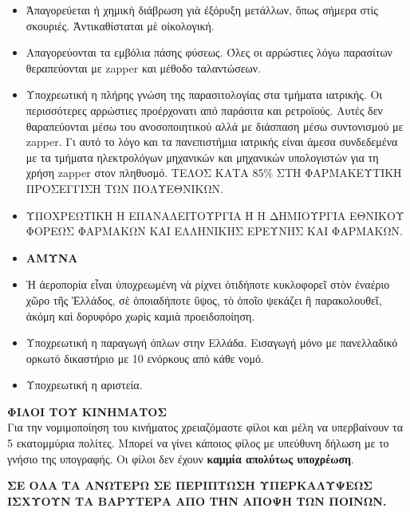\documentclass[a4paper]{article}
\begin{document}
\begin{itemize}
\item Ἀπαγορεύεται ἡ χημικὴ διάβρωση γιὰ ἐξόρυξη μετάλλων, ὅπως σήμερα στὶς σκουριές. Ἀντικαθίσταται μὲ οἰκολογική.
\item Απαγορεύονται τα εμβόλια πάσης φύσεως. Όλες οι αρρώστιες λόγω παρασίτων θεραπεύονται με zapper και μέθοδο ταλαντώσεων.
\item Υποχρεωτική η πλήρης γνώση της παρασιτολογίας στα τμήματα ιατρικής. Οι περισσότερες αρρώστιες προέρχονατι από παράσιτα και ρετροϊούς. Αυτές δεν θαραπεύονται μέσω του ανοσοποιητικού αλλά με διάσπαση μέσω συντονισμού με zapper. Γι αυτό το λόγο και τα πανεπιστήμια ιατρικής είναι άμεσα συνδεδεμένα με τα τμήματα ηλεκτρολόγων μηχανικών και μηχανικών υπολογιστών για τη χρήση zapper στον πληθυσμό. ΤΕΛΟΣ ΚΑΤΑ 85\% ΣΤΗ ΦΑΡΜΑΚΕΥΤΙΚΗ ΠΡΟΣΕΓΓΙΣΗ ΤΩΝ ΠΟΛΥΕΘΝΙΚΩΝ.
\item ΥΠΟΧΡΕΩΤΙΚΗ Η ΕΠΑΝΑΛΕΙΤΟΥΡΓΙΑ Ή Η ΔΗΜΙΟΥΡΓΙΑ ΕΘΝΙΚΟΥ ΦΟΡΕΩΣ ΦΑΡΜΑΚΩΝ ΚΑΙ ΕΛΛΗΝΙΚΗΣ ΕΡΕΥΝΗΣ ΚΑΙ ΦΑΡΜΑΚΩΝ.

\item \textbf{ΑΜΥΝΑ}

\item Ἡ ἀεροπορία εἶναι ὑποχρεωμένη νὰ ρίχνει ὁτιδήποτε κυκλοφορεῖ στὸν ἐναέριο χῶρο τῆς Ἑλλάδος, σὲ ὁποιαδήποτε ὕψος, τὸ ὁποῖο ψεκάζει ἢ παρακολουθεῖ, ἀκόμη καὶ δορυφόρο χωρὶς καμιὰ προειδοποίηση.
\item Υποχρεωτική η παραγωγή όπλων στην Ελλάδα. Εισαγωγή μόνο με πανελλαδικό ορκωτό δικαστήριο με 10 ενόρκους από κάθε νομό.
\item Υποχρεωτική η αριστεία.

\end{itemize}

\textbf{ΦΙΛΟΙ ΤΟΥ ΚΙΝΗΜΑΤΟΣ}\\Για την νομιμοποίηση του κινήματος χρειαζόμαστε φίλοι και μέλη να υπερβαίνουν τα 5 εκατομμύρια πολίτες. Μπορεί να γίνει κάποιος φίλος με υπεύθυνη δήλωση με το γνήσιο της υπογραφής. Οι φίλοι δεν έχουν \textbf{καμμία απολύτως υποχρέωση}.


\textbf{{\Large ΣΕ ΟΛΑ ΤΑ ΑΝΩΤΕΡΩ ΣΕ ΠΕΡΙΠΤΩΣΗ ΥΠΕΡΚΑΛΥΨΕΩΣ ΙΣΧΥΟΥΝ ΤΑ ΒΑΡΥΤΕΡΑ ΑΠΟ ΤΗΝ ΑΠΟΨΗ ΤΩΝ ΠΟΙΝΩΝ.}}
\end{document}
